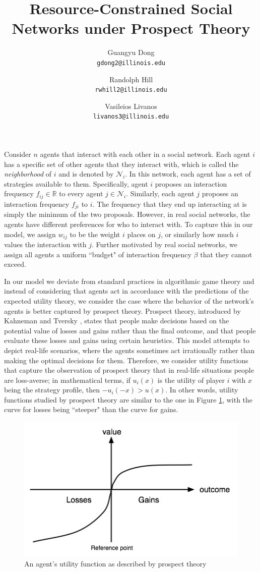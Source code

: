 \documentclass[A4paper,11pt]{article}
\author{
	{\sc Guangyu Dong} \\
	\texttt{gdong2@illinois.edu}
	\and
	{\sc Randolph Hill} \\
	\texttt{rwhill2@illinois.edu}
	\and
	{\sc Vasileios Livanos} \\
	\texttt{livanos3@illinois.edu}
}
\title{
Resource-Constrained Social Networks under Prospect Theory
}
\date{}
\begin{document}
 \maketitle

\par Consider $n$ agents that interact with each other in a social network. Each agent $i$ has a specific set of other agents
that they interact with, which is called the \textit{neighborhood} of $i$ and is denoted by $\mathcal{N}_i$. In this network,
each agent has a set of strategies available to them. Specifically, agent $i$ proposes an interaction frequency
$f_{ij} \in \mathbb{R}$ to every agent $j \in \mathcal{N}_i$. Similarly, each agent $j$ proposes an
interaction frequency $f_{ji}$ to $i$. The frequency that they end up interacting at is simply the minimum of the two
proposals. However, in real social networks, the agents have different preferences for who to interact with. To capture this
in our model, we assign $w_{ij}$ to be the weight $i$ places on $j$, or similarly how much $i$ values the interaction with $j$.
Further motivated by real social networks, we assign all agents a uniform ``budget" of interaction frequency $\beta$ that they
cannot exceed.

\par In our model we deviate from standard practices in algorithmic game theory and instead of considering that agents act
in accordance with the predictions of the expected utility theory, we consider the case where the behavior of the network's
agents is better captured by prospect theory. Prospect theory, introduced by Kahneman and Tversky \cite{KT}, states that people
make decisions based on the potential value of losses and gains rather than the final outcome, and that people evaluate these
losses and gains using certain heuristics. This model attempts to depict real-life scenarios, where the agents sometimes act
irrationally rather than making the optimal decisions for them. Therefore, we consider utility functions that capture the
observation of prospect theory that in real-life situations people are loss-averse; in mathematical terms, if $u_i(x)$ is the
utility of player $i$ with $x$ being the strategy profile, then $- u_i(-x) > u(x)$. In other words, utility functions studied
by prospect theory are similar to the one in Figure \ref{fig:prospect-util}, with the curve for losses being ``steeper" than
the curve for gains.

\begin{figure}[h!]
  \centering
  \includegraphics[width=.35\linewidth]{./Valuefun.jpg}
  \caption{An agent's utility function as described by prospect theory}
  \label{fig:prospect-util}
\end{figure}
\end{document}
